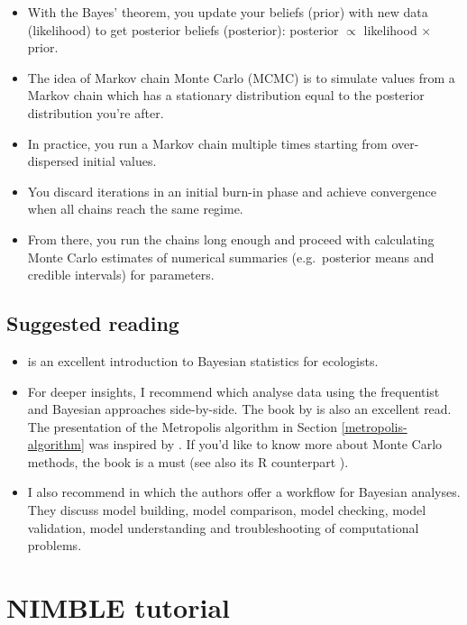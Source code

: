\documentclass[
  12pt,
]{krantz}
\begin{document}
\begin{itemize}
\item
  With the Bayes' theorem, you update your beliefs (prior) with new data (likelihood) to get posterior beliefs (posterior): posterior \(\propto\) likelihood \(\times\) prior.
\item
  The idea of Markov chain Monte Carlo (MCMC) is to simulate values from a Markov chain which has a stationary distribution equal to the posterior distribution you're after.
\item
  In practice, you run a Markov chain multiple times starting from over-dispersed initial values.
\item
  You discard iterations in an initial burn-in phase and achieve convergence when all chains reach the same regime.
\item
  From there, you run the chains long enough and proceed with calculating Monte Carlo estimates of numerical summaries (e.g.~posterior means and credible intervals) for parameters.
\end{itemize}

\section{Suggested reading}\label{suggested-reading}

\begin{itemize}
\item
  \citet{mccarthy2007} is an excellent introduction to Bayesian statistics for ecologists.
\item
  For deeper insights, I recommend \citet{gelmanhill2006} which analyse data using the frequentist and Bayesian approaches side-by-side. The book by \citet{mcelreathbook} is also an excellent read. The presentation of the Metropolis algorithm in Section \ref{metropolis-algorithm} was inspired by \citet{alberthu2019}. If you'd like to know more about Monte Carlo methods, the book \citet{robert2004montecarlo} is a must (see also its R counterpart \citet{robert2004montecarloinr}).
\item
  I also recommend \citet{gelman2020workflow} in which the authors offer a workflow for Bayesian analyses. They discuss model building, model comparison, model checking, model validation, model understanding and troubleshooting of computational problems.
\end{itemize}

\chapter{NIMBLE tutorial}\label{intronimble}
\end{document}
